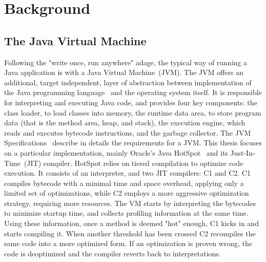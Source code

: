 \chapter{Background}


\section{The Java Virtual Machine}
Following the "write once, run anywhere" adage, the typical way of running a Java application is with a Java Virtual Machine~(JVM).
The JVM offers an additional, target independent, layer of abstraction between implementation of 
the Java programming language~\cite{noauthor_java_nodate-2} and the operating system itself.
It is responsible for interpreting and executing Java code, and provides four key components: 
the class loader, to load classes into memory, the runtime data area, to store program data (that is the method area, heap, and stack), the execution engine, which reads and executes bytecode instructions, and the garbage collector. The JVM Specifications~\cite{noauthor_java_nodate-1} describe in details the requirements for a JVM. 
This thesis focuses on a particular implementation, mainly Oracle's Java HotSpot~\cite{noauthor_hotspot_nodate} and its Just-In-Time~(JIT) compiler. 
HotSpot relies on tiered compilation to optimize code execution. It consists of an interpreter, and two JIT compilers: C1 and C2. 
C1 compiles bytecode with a minimal time and space overhead, applying only a limited set of optimizations, while C2 employs a more aggressive optimization strategy, requiring more resources.
The VM starts by interpreting the bytecodes to minimize startup time, and collects profiling information at the same time. Using these information, once a method is deemed "hot" enough, C1 kicks in and starts compiling it. When another threshold has been crossed C2 
recompiles the same code into a more optimized form. If an optimization is proven wrong, the code is 
deoptimized and the compiler reverts back to interpretations.  

